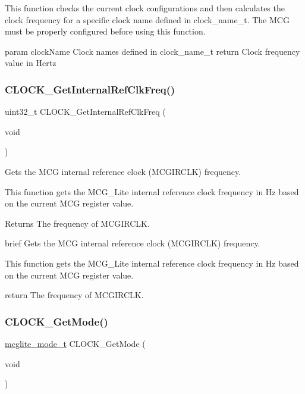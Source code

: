 This function checks the current clock configurations and then calculates the clock frequency for a specific clock name defined in clock\+\_\+name\+\_\+t. The M\+CG must be properly configured before using this function.

param clock\+Name Clock names defined in clock\+\_\+name\+\_\+t return Clock frequency value in Hertz \mbox{\label{group__clock_ga352c4e1fcb54bc5656df3299e154a736}} 
\subsubsection{\texorpdfstring{CLOCK\_GetInternalRefClkFreq()}{CLOCK\_GetInternalRefClkFreq()}}
{\footnotesize\ttfamily uint32\+\_\+t C\+L\+O\+C\+K\+\_\+\+Get\+Internal\+Ref\+Clk\+Freq (\begin{DoxyParamCaption}\item[{void}]{ }\end{DoxyParamCaption})}



Gets the M\+CG internal reference clock (M\+C\+G\+I\+R\+C\+LK) frequency. 

This function gets the M\+C\+G\+\_\+\+Lite internal reference clock frequency in Hz based on the current M\+CG register value.

\begin{DoxyReturn}{Returns}
The frequency of M\+C\+G\+I\+R\+C\+LK.
\end{DoxyReturn}
brief Gets the M\+CG internal reference clock (M\+C\+G\+I\+R\+C\+LK) frequency.

This function gets the M\+C\+G\+\_\+\+Lite internal reference clock frequency in Hz based on the current M\+CG register value.

return The frequency of M\+C\+G\+I\+R\+C\+LK. \mbox{\label{group__clock_gac486df712cf93a890c084c14956dd750}} 
\subsubsection{\texorpdfstring{CLOCK\_GetMode()}{CLOCK\_GetMode()}}
{\footnotesize\ttfamily \mbox{\hyperlink{group__clock_ga7ba2816f49b1b008daa37a55e34dc4a1}{mcglite\+\_\+mode\+\_\+t}} C\+L\+O\+C\+K\+\_\+\+Get\+Mode (\begin{DoxyParamCaption}\item[{void}]{ }\end{DoxyParamCaption})}



